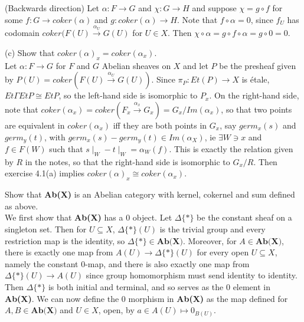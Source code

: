 (Backwards direction) Let $\alpha:F \rightarrow G$ and $\chi:G \rightarrow H$ and suppose $\chi= g \circ f$ for some $f:G \rightarrow coker(\alpha)$ and $g:coker(\alpha) \rightarrow H$. Note that $f \circ \alpha = 0$, since $f_U$ has codomain $coker(F(U) \xrightarrow{\alpha_U} G(U)$ for $U \in X$. Then $\chi \circ \alpha = g \circ f \circ \alpha = g \circ 0 =0$.

(c) Show that $coker(\alpha)_x = coker(\alpha_x)$.\\

Let $\alpha: F \rightarrow G$ for $F$ and $G$ Abelian sheaves on $X$ and let $P$ be the presheaf given by $P(U)=coker(F(U) \xrightarrow{\alpha_U} G(U))$. Since $\pi_P: Et(P) \rightarrow X$ is \'etale, $Et\Gamma EtP \cong EtP$, so the left-hand side is isomorphic to $P_x$. On the right-hand side, note that $coker(\alpha_x)=coker(F_x \xrightarrow{\alpha_x} G_x) = G_x/Im(\alpha_x)$, so that two points are equivalent in $coker(\alpha_x)$ iff they are both points in $G_x$, say $germ_x(s)$ and $germ_y(t)$, with $germ_x(s) - germ_y(t) \in Im(\alpha_X)$, ie $\exists W \ni x$ and $f \in F(W)$ such that $s\mid_W - t\mid_W = \alpha_W(f)$. This is exactly the relation given by $R$ in the notes, so that the right-hand side is isomorphic to $G_x/R$. Then exercise 4.1(a) implies $coker(\alpha)_x \cong coker(\alpha_x)$.

 Show that \textbf{Ab(X)} is an Abelian category with kernel, cokernel and sum defined as above.\\

We first show that \textbf{Ab(X)} has a $0$ object. Let $\Delta \{*\}$ be the constant sheaf on a singleton set. Then for $U \subseteq X$,  $\Delta \{*\}(U)$ is the trivial group and every restriction map is the identity, so $\Delta \{*\} \in \textbf{Ab(X)}$. Moreover, for $A \in \textbf{Ab(X)}$, there is exactly one map from $A(U) \rightarrow \Delta \{*\}(U)$ for every open $U \subseteq X$, namely the constant $0$-map, and there is also exactly one map from $\Delta \{*\}(U) \rightarrow A(U)$ since group homomorphism must send identity to identity. Then $\Delta \{*\}$ is both initial and terminal, and so serves as the $0$ element in \textbf{Ab(X)}. We can now define the $0$ morphism in \textbf{Ab(X)} as the map defined for $A,B \in \textbf{Ab(X)}$ and $U \in X$, open, by $a \in A(U) \mapsto 0_{B(U)}$.\\

